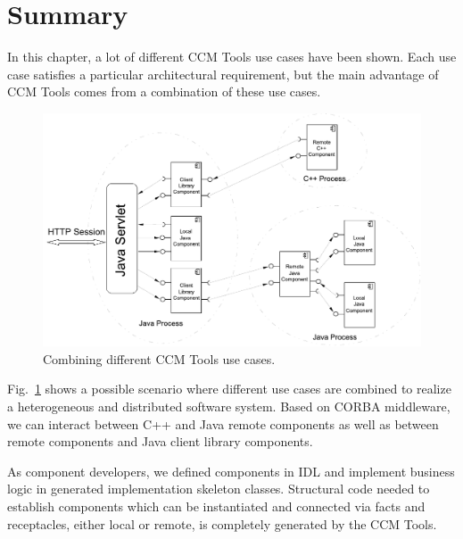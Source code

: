 \section{Summary}
\label{section:LoginExampleSummary}

In this chapter, a lot of different CCM Tools use cases have been shown.
Each use case satisfies a particular architectural requirement, but
the main advantage of CCM Tools comes from a combination of these use cases. 

\begin{figure}[htbp]
    \begin{center}
        \includegraphics [width=14cm,angle=0] {figures/LoginSummary}
        \caption{Combining different CCM Tools use cases.}
        \label{figure:LoginSummery}
    \end{center}
\end{figure}

Fig.~\ref{figure:LoginSummery} shows a possible scenario where different use
cases are combined to realize a 	heterogeneous and distributed software system.
Based on CORBA middleware, we can interact between C++ and Java remote
components as well as between remote components and Java client library
components.

\vspace{3mm}
As component developers, we defined components in IDL and implement business
logic in generated implementation skeleton classes. 
Structural code needed to establish components which can be instantiated and 
connected via facts and receptacles, either local or remote, is completely generated by the
CCM Tools.






\newpage


